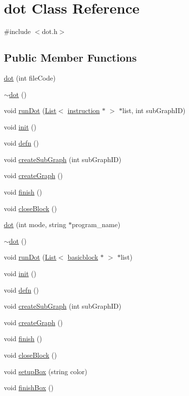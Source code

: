 \hypertarget{classdot}{
\section{dot Class Reference}
\label{classdot}
}


{\ttfamily \#include $<$dot.h$>$}

\subsection*{Public Member Functions}
\begin{DoxyCompactItemize}
\item 
\hyperlink{classdot_afca1c1f39b692528483b78569751068a}{dot} (int fileCode)
\item 
\hyperlink{classdot_a7c31a26ba233474fd5c7857bd3d8158f}{$\sim$dot} ()
\item 
void \hyperlink{classdot_a23bb05ec40259de7239b166b664bfdb4}{runDot} (\hyperlink{classList}{List}$<$ \hyperlink{classinstruction}{instruction} $\ast$ $>$ $\ast$list, int subGraphID)
\item 
void \hyperlink{classdot_a5841f9acea9e636b9630e8a2ebe25382}{init} ()
\item 
void \hyperlink{classdot_a0f2386ca3194247a3e8cb8bf05749a5e}{defn} ()
\item 
void \hyperlink{classdot_a589a9b85d00d4072fd1eecf3b4b90bf0}{createSubGraph} (int subGraphID)
\item 
void \hyperlink{classdot_aac4be16ebdd60983177619a8b7df658f}{createGraph} ()
\item 
void \hyperlink{classdot_accd0278010df6b72404449831d51cd4e}{finish} ()
\item 
void \hyperlink{classdot_acc4e61396656da0a5a0ec085c88e414e}{closeBlock} ()
\item 
\hyperlink{classdot_af11dd579c7b133d259ac9fe60e7ae629}{dot} (int mode, string $\ast$program\_\-name)
\item 
\hyperlink{classdot_a7c31a26ba233474fd5c7857bd3d8158f}{$\sim$dot} ()
\item 
void \hyperlink{classdot_a613147e95e44f245a63a5b08418c95f9}{runDot} (\hyperlink{classList}{List}$<$ \hyperlink{classbasicblock}{basicblock} $\ast$ $>$ $\ast$list)
\item 
void \hyperlink{classdot_a5841f9acea9e636b9630e8a2ebe25382}{init} ()
\item 
void \hyperlink{classdot_a0f2386ca3194247a3e8cb8bf05749a5e}{defn} ()
\item 
void \hyperlink{classdot_a589a9b85d00d4072fd1eecf3b4b90bf0}{createSubGraph} (int subGraphID)
\item 
void \hyperlink{classdot_aac4be16ebdd60983177619a8b7df658f}{createGraph} ()
\item 
void \hyperlink{classdot_accd0278010df6b72404449831d51cd4e}{finish} ()
\item 
void \hyperlink{classdot_acc4e61396656da0a5a0ec085c88e414e}{closeBlock} ()
\item 
void \hyperlink{classdot_ae8c40cee623a5b6e30e7cb4ddf2aff27}{setupBox} (string color)
\item 
void \hyperlink{classdot_ad5acf38fae453ba70cd1532ec2be4b36}{finishBox} ()
\end{DoxyCompactItemize}
